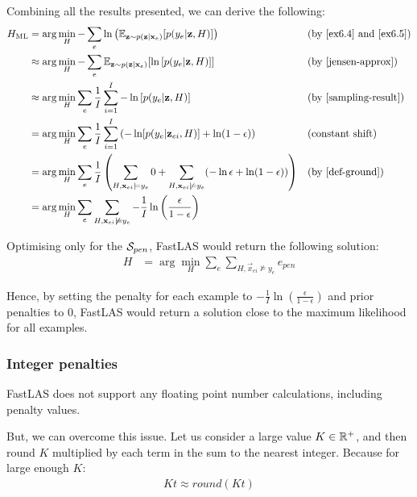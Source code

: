 Combining all the results presented, we can derive the following:
\begin{align}
H_{\text{ML}}
& = \arg\min_{H} 
-\sum_e \ln \left( \mathbb{E}_{\textbf{z} \sim p(\textbf{z}| \textbf{x}_e)}[p(y_e|\textbf{z},H)] \right ) 
&& \text{(by \ref{ex6.4} and \ref{ex6.5})} \nonumber \\
& \approx \arg\min_{H}
-\sum_e \mathbb{E}_{\textbf{z} \sim p(\textbf{z}| \textbf{x}_e)}[\ln \left[ p(y_e|\textbf{z},H) \right ]]  
&& \text{(by \ref{jensen-approx})} \nonumber \\
& \approx \arg\min_{H}
\sum_e \frac{1}{I} \sum_{i=1}^I -\ln \left[ p(y_e|\textbf{z},H) \right ]
&& \text{(by \ref{sampling-result})} \nonumber \\
& = \arg\min_{H} \sum_e \frac{1}{I} \sum_{i=1}^I  \left(-\ln  [p(y_e|\textbf{z}_{ei},H)] + \ln (1-\epsilon) \right)
&& \text{(constant shift)} \nonumber \\
& = \arg\min_{H}
\sum_e \frac{1}{I} 
\left (
\sum_{H,\textbf{x}_{ei}\models y_e} 0
+
\sum_{H,\textbf{x}_{ei}\not\models y_e} (-\ln \epsilon + \ln (1 - \epsilon))
\right ) 
&& \text{(by \ref{def-ground})} \nonumber \\
& = \arg\min_{H}
\sum_e  
\sum_{H,\textbf{x}_{ei}\not\models y_e} -\frac{1}{I}\ln \left ( \frac{\epsilon}{1 - \epsilon} \right ) \label{eq-final-no-int}
\end{align}


Optimising only for the $\mathcal{S}_{pen}$, FastLAS would return the following solution:
\begin{align}
H
& = \arg\min_{H}
\sum_e  
\sum_{H,\vec{x}_{ei}\not\models y_e} e_{pen}
\end{align}

Hence, by setting the penalty for each example to $-\frac{1}{I} \ln \left ( \frac{\epsilon}{1 - \epsilon} \right )$ and prior penalties to 0, FastLAS would return a solution close to the maximum likelihood for all examples.

\subsubsection{Integer penalties}
\label{integer-penalties}

FastLAS does not support any floating point number calculations, including penalty values.

But, we can overcome this issue.
Let us consider a large value $K \in \mathbb{R}^+$, and then round $K$ multiplied by each term in the sum to the nearest integer. Because for large enough $K$:
\begin{align}
    Kt \approx round(Kt) \label{rounding}
\end{align}


